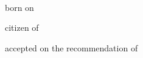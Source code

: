 {\begin{titlepage}
		\vspace{0.8cm}
		
    \begin{center}
      \large \acatitlestring \\[1.5ex]

				\vspace{0.8cm}

       born on \dateofbirthstring \\[1.5ex]

		\vspace{0.2cm}

      citizen of \citizenstring
    \end{center}

		\vspace{2.0cm}

    \begin{center}
      \large accepted on the recommendation of \\[1.5ex]
      \examinerstring \\[1.5ex] \coexaminerstring
    \end{center}

		\vspace{2.0cm}


    \begin{center}
      \large\datestring
    \end{center}
		\endgroup
    \if@twoside
      \newpage
      \thispagestyle{empty}
    \fi
		\restoregeometry
  \end{titlepage}
}
